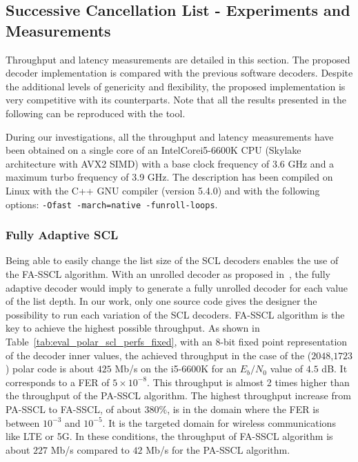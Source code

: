 \subsection{Successive Cancellation List - Experiments and Measurements}

Throughput and latency measurements are detailed in this section. The proposed
decoder implementation is compared with the previous software decoders. Despite
the additional levels of genericity and flexibility, the proposed implementation
is very competitive with its counterparts. Note that all the results presented
in the following can be reproduced with the \AFFECT tool.

During our investigations, all the throughput and latency measurements have been
obtained on a single core of an Intel\R Core\TM i5-6600K CPU (Skylake
architecture with AVX2 SIMD) with a base clock frequency of 3.6 GHz and a
maximum turbo frequency of 3.9 GHz. The description has been compiled on Linux
with the C++ GNU compiler (version 5.4.0) and with the following options:
\verb|-Ofast -march=native -funroll-loops|.

\subsubsection{Fully Adaptive SCL}

Being able to easily change the list size of the SCL decoders enables the use of
the FA-SSCL algorithm. With an unrolled decoder as proposed
in~\cite{Sarkis2016}, the fully adaptive decoder would imply to generate a fully
unrolled decoder for each value of the list depth. In our work, only one source
code gives the designer the possibility to run each variation of the SCL
decoders. FA-SSCL algorithm is the key to achieve the highest possible
throughput. As shown in Table~\ref{tab:eval_polar_scl_perfs_fixed}, with an
8-bit fixed point representation of the decoder inner values, the achieved
throughput in the case of the ($2048$,$1723$) polar code is about $425$ Mb/s on
the i5-6600K for an $E_b/N_0$ value of $4.5$ dB. It corresponds to a FER of
$5\times10^{-8}$. This throughput is almost 2 times higher than the throughput
of the PA-SSCL algorithm. The highest throughput increase from PA-SSCL to
FA-SSCL, of about $380\%$, is in the domain where the FER is between $10^{-3}$
and $10^{-5}$. It is the targeted domain for wireless communications like LTE or
5G. In these conditions, the throughput of FA-SSCL algorithm is about $227$ Mb/s
compared to $42$ Mb/s for the PA-SSCL algorithm.

